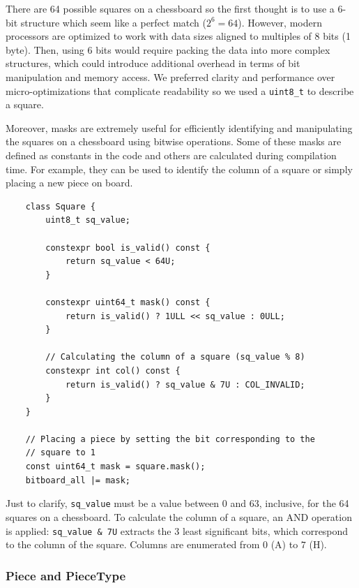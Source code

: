 There are 64 possible squares on a chessboard so the first thought is to use a 6-bit structure which seem like a perfect match ($2^6 = 64$). However, modern processors are optimized to work with data sizes aligned to multiples of 8 bits (1 byte). Then, using 6 bits would require packing the data into more complex structures, which could introduce additional overhead in terms of bit manipulation and memory access. We preferred clarity and performance over micro-optimizations that complicate readability so we used a \texttt{uint8\_t} to describe a square.

\vspace{1em}

\noindent Moreover, masks are extremely useful for efficiently identifying and manipulating the squares on a chessboard using bitwise operations. Some of these masks are defined as constants in the code and others are calculated during compilation time. For example, they can be used to identify the column of a square or simply placing a new piece on board.

\begin{lstlisting}
    class Square {
        uint8_t sq_value;

        constexpr bool is_valid() const {
            return sq_value < 64U;
        }

        constexpr uint64_t mask() const {
            return is_valid() ? 1ULL << sq_value : 0ULL;
        }

        // Calculating the column of a square (sq_value % 8)
        constexpr int col() const {
            return is_valid() ? sq_value & 7U : COL_INVALID;
        }
    }

    // Placing a piece by setting the bit corresponding to the
    // square to 1
    const uint64_t mask = square.mask();
    bitboard_all |= mask;
\end{lstlisting}

\noindent Just to clarify, \texttt{sq\_value} must be a value between $0$ and $63$, inclusive, for the 64 squares on a chessboard. To calculate the column of a square, an AND operation is applied: \texttt{sq\_value \& 7U} extracts the 3 least significant bits, which correspond to the column of the square. Columns are enumerated from $0$ (A) to $7$ (H).

\subsubsection{Piece and PieceType}

